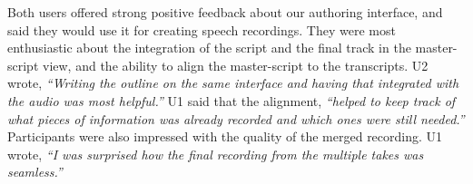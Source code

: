 Both users offered strong positive feedback about our authoring
interface, and said they would use it for creating speech recordings. They were most enthusiastic about the integration
of the script and the final track in the master-script view,
and the ability to align the master-script to the transcripts.
U2 wrote, \textit{``Writing the outline on the same interface and having
that integrated with the audio was most helpful.''}  U1 said
that the alignment, \textit{``helped to keep track of what pieces
of information was already recorded and which ones were still
needed.''} Participants were also impressed with the quality
of the merged recording. U1 wrote, \textit{``I was surprised
how the final recording from the multiple takes was seamless.''}  

